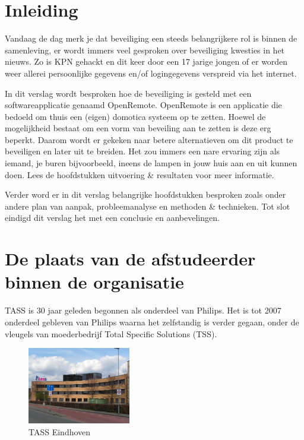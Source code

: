 \documentclass[]{article}
\begin{document}
\newpage
\section{Inleiding}
Vandaag de dag merk je dat beveiliging een steeds belangrijkere rol is binnen
de samenleving, er wordt immers veel gesproken over beveiliging kwesties in
het nieuws. Zo is KPN gehackt en dit keer door een 17 jarige jongen of
er worden weer allerei persoonlijke gegevens en/of logingegevens verspreid via het
internet.

In dit verslag wordt besproken hoe de beveiliging is gesteld met een
softwareapplicatie genaamd OpenRemote. OpenRemote is een applicatie die
bedoeld om thuis een (eigen) domotica systeem op te zetten. Hoewel de mogelijkheid 
bestaat om een vorm van beveiling aan te zetten is deze erg beperkt. Daarom wordt er gekeken naar betere
alternatieven om dit product te beveiligen en later uit te breiden. Het zou
immers een nare ervaring zijn als iemand, je buren bijvoorbeeld, ineens de lampen in jouw huis aan en uit
kunnen doen. Lees de hoofdstukken uitvoering \& resultaten voor meer informatie.

Verder word er in dit verslag belangrijke hoofdstukken besproken zoals onder andere
plan van aanpak, probleemanalyse en methoden \& technieken.
Tot slot eindigd dit verslag het met een conclusie en aanbevelingen.

\newpage
\section{De plaats van de afstudeerder binnen de organisatie}

TASS is 30 jaar geleden begonnen als onderdeel van Philips. Het is tot 2007
onderdeel gebleven van Philips waarna het zelfstandig is verder gegaan,
onder de vleugels van moederbedrijf Total Specific Solutions (TSS).

\begin{figure}
  \begin{center}
    \includegraphics[width=0.40\textwidth]{tass_eindhoven.pdf}
  \end{center}
  \caption{TASS Eindhoven}
\end{figure}
\end{document}

